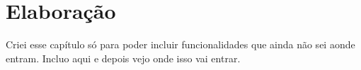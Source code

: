 \chapter{Elaboração}

Criei esse capítulo só para poder incluir funcionalidades que ainda não sei aonde entram.
Incluo aqui e depois vejo onde isso vai entrar.


